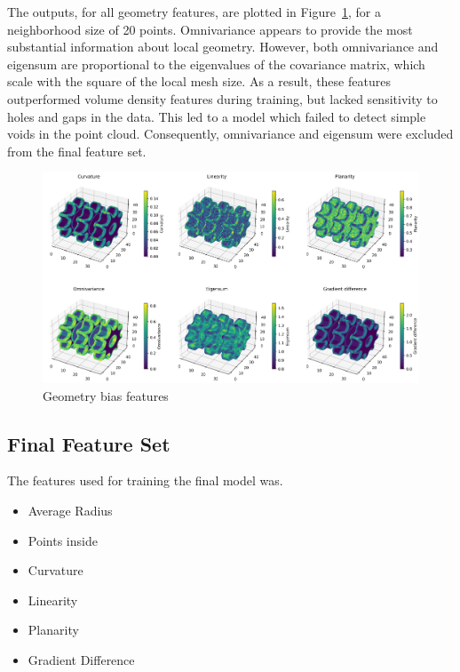 The outputs, for all geometry features, are plotted in Figure~\ref{fig:feature_plot}, for a neighborhood size of 20 points. Omnivariance appears to provide the most substantial information about local geometry. However, both omnivariance and eigensum are proportional to the eigenvalues of the covariance matrix, which scale with the square of the local mesh size. As a result, these features outperformed volume density features during training, but lacked sensitivity to holes and gaps in the data. This led to a model which failed to detect simple voids in the point cloud. Consequently, omnivariance and eigensum were excluded from the final feature set.

\begin{figure}[t]
    \centering
    \includegraphics[width=\textwidth]{figures/feature_plots_lowQ.png}
    \caption{Geometry bias features}\label{fig:feature_plot}
\end{figure}

\subsection*{Final Feature Set}
The features used for training the final model was.
\begin{itemize}
    \item Average Radius
    \item Points inside
    \item Curvature
    \item Linearity
    \item Planarity
    \item Gradient Difference
\end{itemize}